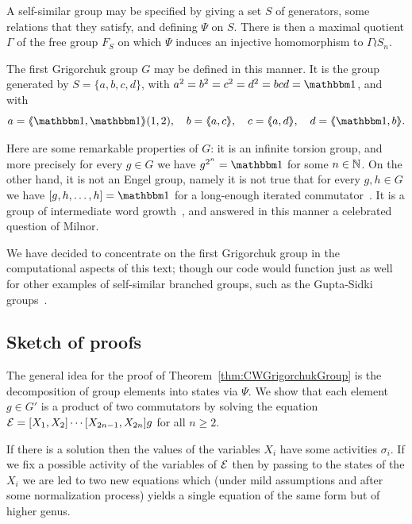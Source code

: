 \documentclass[a4paper,11pt]{amsart}
\begin{document}
A self-similar group may be specified by giving a set $S$ of
generators, some relations that they satisfy, and defining $\Psi$ on
$S$. There is then a maximal quotient $\Gamma$ of the free group $F_S$
on which $\Psi$ induces an injective homomorphism to $\Gamma\wr S_n$.

The first Grigorchuk group $G$ may be defined in this manner. It is
the group generated by $S=\{a,b,c,d\}$, with $a^2=b^2=c^2=d^2=bcd=\id$,
and with
\[a=\pair{\id,\id}(1,2),\quad b=\pair{a,c},\quad c=\pair{a,d},\quad d=\pair{\id,b}. \]

Here are some remarkable properties of $G$: it is an infinite torsion
group, and more precisely for every $g\in G$ we have $g^{2^n}=\id$ for
some $n\in\mathbb{N}$. On the other hand, it is not an Engel group, namely it
is not true that for every $g,h\in G$ we have $[g,h,\dots,h]=\id$ for
a long-enough iterated commutator~\cite{Bartholdi:Engel}. It is a
group of intermediate word growth~\cite{Grigorchuk:Milnor}, and
answered in this manner a celebrated question of Milnor.

We have decided to concentrate on the first Grigorchuk group in the
computational aspects of this text; though our code would function
just as well for other examples of self-similar branched groups, such
as the Gupta-Sidki groups~\cite{Gupta-Sidki:PGroups}.


\subsection{Sketch of proofs}
The general idea for the proof of Theorem~\ref{thm:CWGrigorchukGroup}
is the decomposition of group elements into states via $\Psi$. We show
that each element $g\in G'$ is a product of two commutators by solving
the equation $\mathcal{E}=[X_1,X_2]\cdots[X_{2n-1},X_{2n}]g$ for all
$n\geq 2$.

If there is a solution then the values of the variables $X_i$ have
some activities $\sigma_i$. If we fix a possible activity of the
variables of $\mathcal{E}$ then by passing to the states of the $X_i$ we are
led to two new equations which (under mild assumptions and after some
normalization process) yields a single equation of the same form but
of higher genus.
\end{document}
